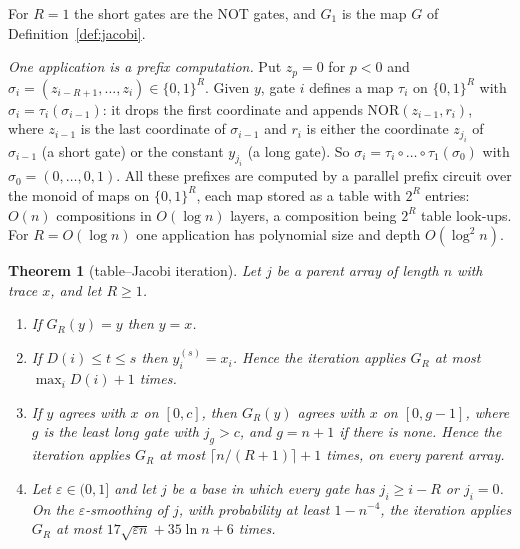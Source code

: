 \documentclass[11pt]{amsart}
\newtheorem{theorem}{Theorem}
\theoremstyle{definition}
\theoremstyle{remark}
\newcommand{\eps}{\varepsilon}
\newcommand{\NOR}{\mathrm{NOR}}
\begin{document}
\noindent For $R=1$ the short gates are the NOT gates, and $G_1$ is the map $G$ of
Definition~\ref{def:jacobi}.

\emph{One application is a prefix computation.} Put $z_p=0$ for $p<0$ and
$\sigma_i=(z_{i-R+1},\dots,z_i)\in\{0,1\}^R$. Given $y$, gate $i$ defines a map $\tau_i$ on
$\{0,1\}^R$ with $\sigma_i=\tau_i(\sigma_{i-1})$: it drops the first coordinate and appends
$\NOR(z_{i-1},r_i)$, where $z_{i-1}$ is the last coordinate of $\sigma_{i-1}$ and $r_i$ is either
the coordinate $z_{j_i}$ of $\sigma_{i-1}$ (a short gate) or the constant $y_{j_i}$ (a long gate).
So $\sigma_i=\tau_i\circ\dots\circ\tau_1(\sigma_0)$ with $\sigma_0=(0,\dots,0,1)$. All these
prefixes are computed by a parallel prefix circuit over the monoid of maps on $\{0,1\}^R$, each map
stored as a table with $2^R$ entries: $O(n)$ compositions in $O(\log n)$ layers, a composition
being $2^R$ table look-ups. For $R=O(\log n)$ one application has polynomial size and depth
$O(\log^2n)$.

\begin{theorem}[table--Jacobi iteration]\label{thm:table}
Let $j$ be a parent array of length $n$ with trace $x$, and let $R\ge1$.
\begin{enumerate}[label=(\alph*),leftmargin=2.4em]
\item If $G_R(y)=y$ then $y=x$.
\item If $D(i)\le t\le s$ then $y^{(s)}_i=x_i$. Hence the iteration applies $G_R$ at most
$\max_iD(i)+1$ times.
\item If $y$ agrees with $x$ on $[0,c]$, then $G_R(y)$ agrees with $x$ on $[0,g-1]$, where $g$ is the
least long gate with $j_g>c$, and $g=n+1$ if there is none. Hence the iteration applies $G_R$ at
most $\lceil n/(R+1)\rceil+1$ times, on every parent array.
\item Let $\eps\in(0,1]$ and let $j$ be a base in which every gate has $j_i\ge i-R$ or $j_i=0$. On
the $\eps$-smoothing of $j$, with probability at least $1-n^{-4}$, the iteration applies $G_R$ at
most $17\sqrt{\eps n}+35\ln n+6$ times.
\end{enumerate}
\end{theorem}
\end{document}
